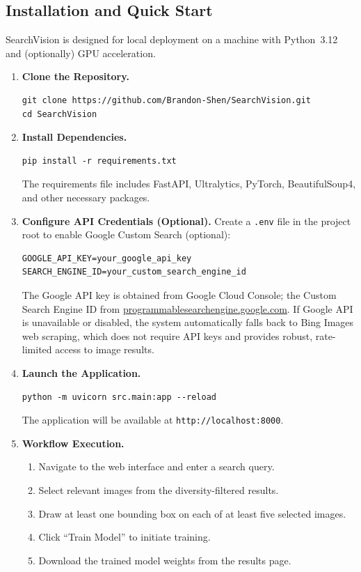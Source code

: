 \documentclass[12pt, letterpaper]{article}
\begin{document}
\subsection{Installation and Quick Start}

SearchVision is designed for local deployment on a machine with Python~3.12 and
(optionally) GPU acceleration.

\begin{enumerate}
  \item \textbf{Clone the Repository.}
\begin{verbatim}
git clone https://github.com/Brandon-Shen/SearchVision.git
cd SearchVision
\end{verbatim}

  \item \textbf{Install Dependencies.}
\begin{verbatim}
pip install -r requirements.txt
\end{verbatim}
    The requirements file includes FastAPI, Ultralytics, PyTorch, BeautifulSoup4, and other
    necessary packages.

  \item \textbf{Configure API Credentials (Optional).}
    Create a \texttt{.env} file in the project root to enable Google Custom Search (optional):
\begin{verbatim}
GOOGLE_API_KEY=your_google_api_key
SEARCH_ENGINE_ID=your_custom_search_engine_id
\end{verbatim}
    The Google API key is obtained from Google Cloud Console; the Custom Search Engine ID
    from \url{programmablesearchengine.google.com}. If Google API is unavailable or disabled, 
    the system automatically falls back to Bing Images web scraping, which does not require 
    API keys and provides robust, rate-limited access to image results.

  \item \textbf{Launch the Application.}
\begin{verbatim}
python -m uvicorn src.main:app --reload
\end{verbatim}
    The application will be available at \texttt{http://localhost:8000}.

  \item \textbf{Workflow Execution.}
    \begin{enumerate}[label=\alph*.]
      \item Navigate to the web interface and enter a search query.
      \item Select relevant images from the diversity-filtered results.
      \item Draw at least one bounding box on each of at least five selected images.
      \item Click ``Train Model'' to initiate training.
      \item Download the trained model weights from the results page.
    \end{enumerate}
\end{enumerate}
\end{document}
